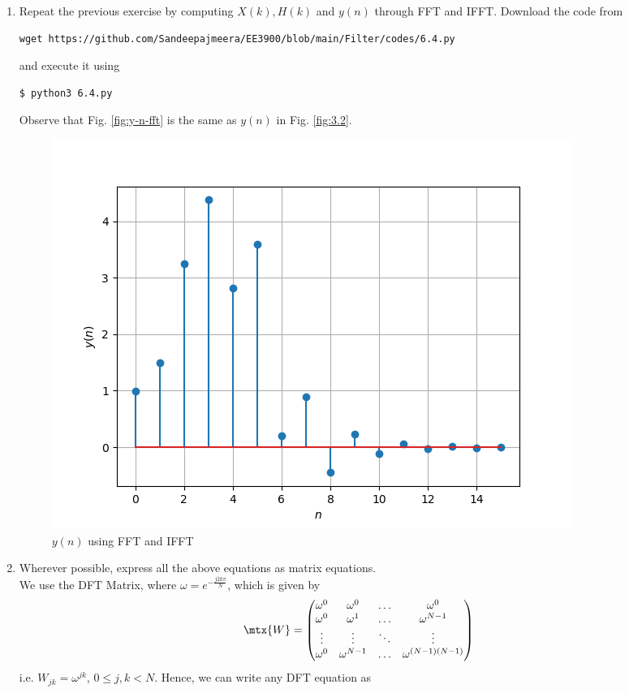 \documentclass[journal,12pt,twocolumn]{IEEEtran}
\renewcommand\thesection{\arabic{section}}
\begin{document}
\begin{enumerate}[label=\thesection.\arabic*
,ref=\thesection.\theenumi]
\item Repeat the previous exercise by computing $X(k), H(k)$ and $y(n)$ through FFT and 
 IFFT.
 \solution Download the code from
\begin{lstlisting}
wget https://github.com/Sandeepajmeera/EE3900/blob/main/Filter/codes/6.4.py
\end{lstlisting}
and execute it using
\begin{lstlisting}
$ python3 6.4.py
\end{lstlisting}
Observe that Fig. \eqref{fig:y-n-fft} is the same as $y(n)$ in Fig. \eqref{fig:3.2}.
\begin{figure}
\centering
\includegraphics[width=\columnwidth]{figs/6.4.png}
\caption{$y(n)$ using FFT and IFFT}
\label{fig:y-n-fft}
\end{figure}
\item Wherever possible, express all the above equations as matrix equations.\\
\solution
We use the DFT Matrix, where $\omega = e^{-\frac{j2k\pi}{N}}$, which is given by
\begin{align}
	\mtx{W} = 
	\begin{pmatrix}
		\omega^0 & \omega^0 & \ldots & \omega^0 \\
		\omega^0 & \omega^1 & \ldots & \omega^{N - 1} \\
		\vdots & \vdots & \ddots & \vdots \\
		\omega^0 & \omega^{N - 1} & \ldots & \omega^{(N -1)(N - 1)}
	\end{pmatrix}
\end{align}
i.e. $W_{jk} = \omega^{jk}$, $0 \leq j, k < N$. Hence, we can write any DFT equation as

\end{enumerate}
\end{document}
